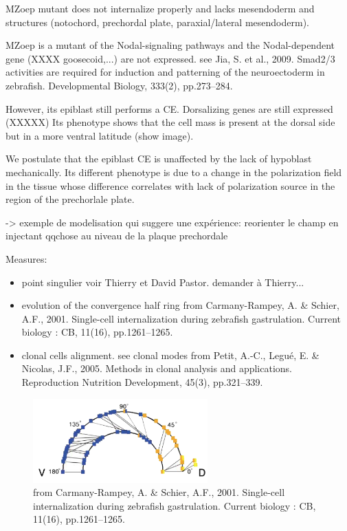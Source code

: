   MZoep mutant does not internalize properly and lacks mesendoderm and structures (notochord, prechordal plate, paraxial/lateral mesendoderm).   

  MZoep is a mutant of the Nodal-signaling pathways and the Nodal-dependent gene (XXXX goosecoid,...) are not expressed. see Jia, S. et al., 2009. Smad2/3 activities are required for induction and patterning of the neuroectoderm in zebrafish. Developmental Biology, 333(2), pp.273–284. \cite{Jia:2009ez}

  However, its epiblast still performs a CE.    Dorsalizing genes are still expressed (XXXXX)   Its phenotype shows that the cell mass is present at the dorsal side but in a more ventral latitude (show image). 

  We postulate that the epiblast CE is unaffected by the lack of hypoblast mechanically. Its different phenotype is due to a change in the polarization field in the tissue whose difference correlates with lack of polarization source in the region of the prechorlale plate. 

  -> exemple de modelisation qui suggere une expérience: reorienter le champ en injectant qqchose au niveau de la plaque prechordale 

  Measures: 
\begin{itemize}
	\item point singulier voir Thierry et David Pastor. demander à Thierry...
	\item evolution of the convergence half ring from Carmany-Rampey, A. & Schier, A.F., 2001. Single-cell internalization during zebrafish gastrulation. Current biology : CB, 11(16), pp.1261–1265. 
	\item clonal cells alignment. see clonal modes from Petit, A.-C., Legué, E. & Nicolas, J.F., 2005. Methods in clonal analysis and applications. Reproduction Nutrition Development, 45(3), pp.321–339. \cite{Petit:2005dp}
\end{itemize}
\begin{figure}
\begin{center}
\includegraphics[width=0.6\textwidth]{../../images/Cases_Studies/Case_7_Convergence_extension/carmany_rampey_2001.png}
\end{center}
\caption{from Carmany-Rampey, A. & Schier, A.F., 2001. Single-cell internalization during zebrafish gastrulation. Current biology : CB, 11(16), pp.1261–1265. \cite{CarmanyRampey:2001uy}}
\label{Case_7_Convergence_extension_carmany_rampey_2001}
\end{figure}

